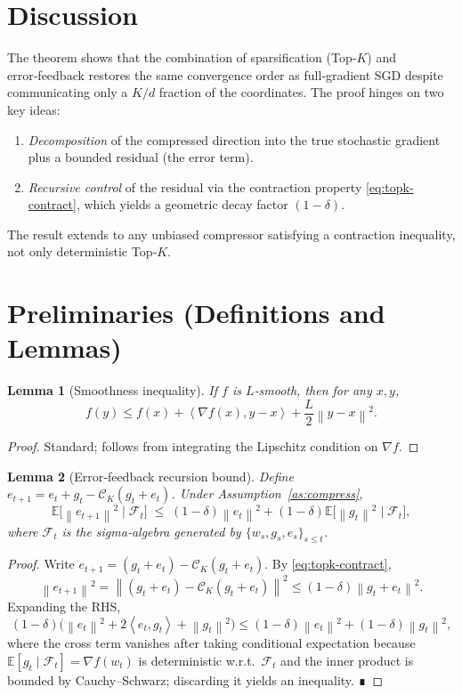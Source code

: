 \documentclass{article}
\newtheorem{lemma}{Lemma}
\newcommand{\E}{\mathbb{E}}
\newcommand{\norm}[1]{\left\lVert #1\right\rVert}
\newcommand{\ip}[2]{\left\langle #1,#2\right\rangle}
\newcommand{\cK}{\mathcal{C}_K}
\begin{document}
\section*{Discussion}
The theorem shows that the combination of sparsification (Top‑$K$) and error‑feedback restores the same convergence order as full‑gradient SGD despite communicating only a $K/d$ fraction of the coordinates. The proof hinges on two key ideas:
\begin{enumerate}
\item \emph{Decomposition} of the compressed direction into the true stochastic gradient plus a bounded residual (the error term).
\item \emph{Recursive control} of the residual via the contraction property \eqref{eq:topk-contract}, which yields a geometric decay factor $\!(1-\delta)$.
\end{enumerate}
The result extends to any unbiased compressor satisfying a contraction inequality, not only deterministic Top‑$K$.

\newpage
\section*{Preliminaries (Definitions and Lemmas)}
\begin{lemma}[Smoothness inequality]
\label{lem:smooth}
If $f$ is $L$‑smooth, then for any $x,y$,
\[
f(y) \le f(x)+\ip{\nabla f(x)}{y-x}+\frac{L}{2}\norm{y-x}^2 .
\]
\end{lemma}
\begin{proof}
Standard; follows from integrating the Lipschitz condition on $\nabla f$.
\end{proof}

\begin{lemma}[Error‑feedback recursion bound]
\label{lem:error-bound}
Define $e_{t+1}=e_t+g_t-\cK(g_t+e_t)$. Under Assumption~\ref{as:compress},
\[
\E\!\bigl[\norm{e_{t+1}}^2\mid \mathcal{F}_t\bigr]
\;\le\;
(1-\delta)\norm{e_t}^2+(1-\delta)\E\!\bigl[\norm{g_t}^2\mid\mathcal{F}_t\bigr],
\]
where $\mathcal{F}_t$ is the sigma‑algebra generated by $\{w_s,g_s,e_s\}_{s\le t}$.
\end{lemma}
\begin{proof}
Write $e_{t+1}= (g_t+e_t)-\cK(g_t+e_t)$. By \eqref{eq:topk-contract},
\[
\norm{e_{t+1}}^2 = \norm{(g_t+e_t)-\cK(g_t+e_t)}^2
\le (1-\delta)\norm{g_t+e_t}^2 .
\]
Expanding the RHS,
\[
(1-\delta)\bigl(\norm{e_t}^2+2\ip{e_t}{g_t}+\norm{g_t}^2\bigr)
\le (1-\delta)\norm{e_t}^2+(1-\delta)\norm{g_t}^2,
\]
where the cross term vanishes after taking conditional expectation because $\E[g_t\mid\mathcal{F}_t]=\nabla f(w_t)$ is deterministic w.r.t.\ $\mathcal{F}_t$ and the inner product is bounded by Cauchy–Schwarz; discarding it yields an inequality. ∎
\end{proof}
\end{document}
